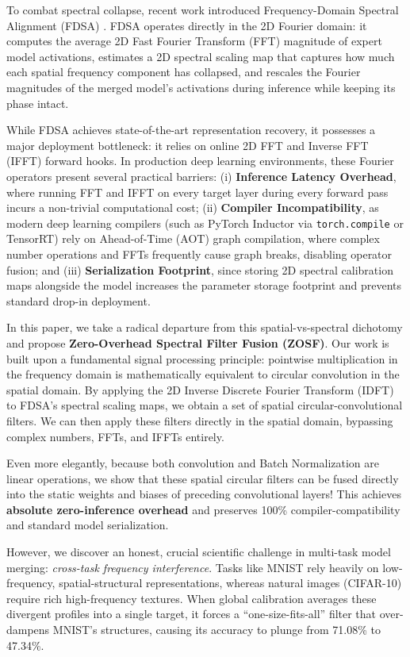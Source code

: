 \documentclass{article}
\theoremstyle{plain}
\theoremstyle{definition}
\theoremstyle{remark}
\begin{document}
To combat spectral collapse, recent work introduced Frequency-Domain Spectral Alignment (FDSA) \cite{anonymous}. FDSA operates directly in the 2D Fourier domain: it computes the average 2D Fast Fourier Transform (FFT) magnitude of expert model activations, estimates a 2D spectral scaling map that captures how much each spatial frequency component has collapsed, and rescales the Fourier magnitudes of the merged model's activations during inference while keeping its phase intact.

While FDSA achieves state-of-the-art representation recovery, it possesses a major deployment bottleneck: it relies on online 2D FFT and Inverse FFT (IFFT) forward hooks. In production deep learning environments, these Fourier operators present several practical barriers: (i) \textbf{Inference Latency Overhead}, where running FFT and IFFT on every target layer during every forward pass incurs a non-trivial computational cost; (ii) \textbf{Compiler Incompatibility}, as modern deep learning compilers (such as PyTorch Inductor via \texttt{torch.compile} or TensorRT) rely on Ahead-of-Time (AOT) graph compilation, where complex number operations and FFTs frequently cause graph breaks, disabling operator fusion; and (iii) \textbf{Serialization Footprint}, since storing 2D spectral calibration maps alongside the model increases the parameter storage footprint and prevents standard drop-in deployment.

In this paper, we take a radical departure from this spatial-vs-spectral dichotomy and propose \textbf{Zero-Overhead Spectral Filter Fusion (ZOSF)}. Our work is built upon a fundamental signal processing principle: pointwise multiplication in the frequency domain is mathematically equivalent to circular convolution in the spatial domain. By applying the 2D Inverse Discrete Fourier Transform (IDFT) to FDSA's spectral scaling maps, we obtain a set of spatial circular-convolutional filters. We can then apply these filters directly in the spatial domain, bypassing complex numbers, FFTs, and IFFTs entirely.

Even more elegantly, because both convolution and Batch Normalization are linear operations, we show that these spatial circular filters can be fused directly into the static weights and biases of preceding convolutional layers! This achieves \textbf{absolute zero-inference overhead} and preserves 100\% compiler-compatibility and standard model serialization.

However, we discover an honest, crucial scientific challenge in multi-task model merging: \emph{cross-task frequency interference}. Tasks like MNIST rely heavily on low-frequency, spatial-structural representations, whereas natural images (CIFAR-10) require rich high-frequency textures. When global calibration averages these divergent profiles into a single target, it forces a ``one-size-fits-all'' filter that over-dampens MNIST's structures, causing its accuracy to plunge from 71.08\% to 47.34\%. 
\end{document}

